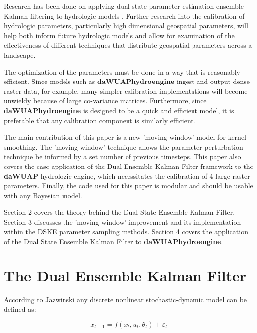 \documentclass[utf8]{frontiersSCNS} %
\begin{document}
Research has been done on applying dual state parameter estimation ensemble Kalman filtering to hydrologic models \cite{Moradkhani2005}. Further research into the calibration of hydrologic parameters, particularly high dimensional geospatial parameters, will help both inform future hydrologic models and allow for examination of the effectiveness of different techniques that distribute geospatial parameters across a landscape.

The optimization of the parameters must be done in a way that is reasonably efficient. Since models such as \textbf{daWUAPhydroengine} ingest and output dense raster data, for example, many simpler calibration implementations will become unwieldy because of large co-variance matrices. Furthermore, since \textbf{daWUAPhydroengine} is designed to be a quick and efficient model, it is preferable that any calibration component is similarly efficient.

The main contribution of this paper is a new 'moving window' model for kernel smoothing. The 'moving window' technique allows the parameter perturbation technique be informed by a set number of previous timesteps. This paper also covers the case application of the Dual Ensemble Kalman Filter framework to the \textbf{daWUAP} hydrologic engine, which necessitates the calibration of 4 large raster parameters. Finally, the code used for this paper is modular and should be usable with any Bayesian model.

Section 2 covers the theory behind the Dual State Ensemble Kalman Filter. Section 3 discusses the 'moving window' improvement and its implementation within the DSKE parameter sampling methods. Section 4 covers the application of the Dual State Ensemble Kalman Filter to \textbf{daWUAPhydroengine}.



\section{The Dual Ensemble Kalman Filter}

According to Jazwinski \cite{Jazwinski1970} any discrete nonlinear stochastic-dynamic model can be defined as:

\begin{equation}\label{eq:gen_stoc}
x_{t+1} = f(x_{t}, u_{t}, \theta_{t}) + \varepsilon_{t}
\end{equation}
\end{document}
